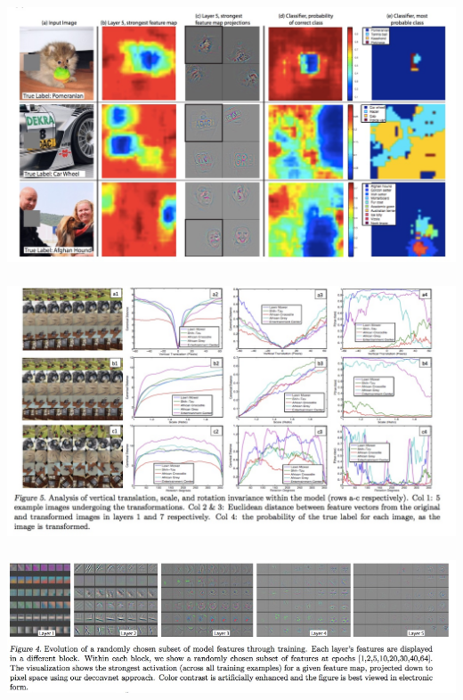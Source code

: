 \documentclass[xetex,mathserif,serif,aspectratio=169]{beamer}
\begin{document}
\begin{frame}[fragile] \frametitle{} \oldB \small

\begin{center}
\includegraphics[width=\textwidth]{img/vizCover.jpg}
\end{center}

\end{frame}

\begin{frame}[fragile] \frametitle{} \oldB \small

\begin{center}
\includegraphics[width=\textwidth]{img/vizDistort.jpg}
\end{center}

\end{frame}

\begin{frame}[fragile] \frametitle{} \oldB \small

\begin{center}
\includegraphics[width=\textwidth]{img/vizEvolve.jpg}
\end{center}

\end{frame}
\end{document}
